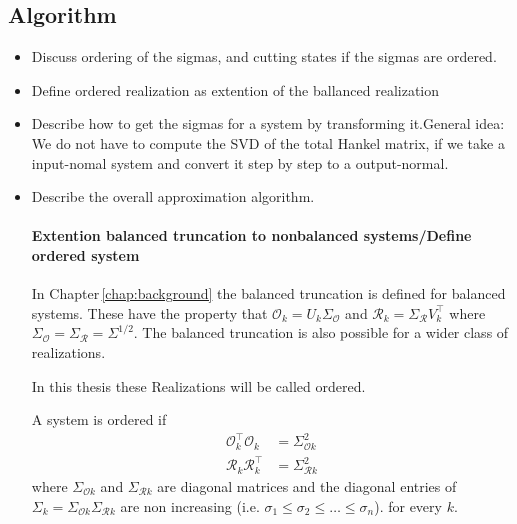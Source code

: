 \documentclass[doctype=mastersthesis,BCOR=15mm,biblatex]{ldvbook}%
\DeclareMathOperator{\diag}{diag}
\newcommand{\R}{\mathcal{R}} %
\newcommand{\Ob}{\mathcal{O}} %
\begin{document}
\subsection{Algorithm}
\begin{itemize}


\item Discuss ordering of the sigmas, and cutting states if the sigmas are ordered.
\item Define ordered realization as extention of the ballanced realization

\item Describe how to get the sigmas for a system by transforming it.General idea: We do not have to compute the SVD of the total Hankel matrix, if we take a input-nomal system and convert it step by step to a output-normal.

\item Describe the overall approximation algorithm.

\paragraph{Extention balanced truncation to nonbalanced systems/Define ordered system}
In Chapter\,\ref{chap:background} the balanced truncation is defined for balanced systems.
These have the property that $\Ob_k = U_k \Sigma_\Ob$ and $\R_k = \Sigma_\R V_k^\top$ where $\Sigma_\Ob = \Sigma_\R=\Sigma^{1/2}$.
The balanced truncation is also possible for a wider class of realizations.

In this thesis these Realizations will be called ordered.
\begin{definition}
	A system is ordered if 
	\begin{subequations}
	\begin{align}
		\Ob_k^\top \Ob_k &= \Sigma_ {\Ob k}^2 \label{eq:orderd_obs}\\ %
		\R_k \R_k^\top &= \Sigma_ {\R k}^2 \label{eq:orderd_reach}%
	\end{align}
	\end{subequations}
	where $\Sigma_{\Ob k}$ and $\Sigma_{\R k}$ are diagonal matrices
	and the diagonal entries of $\Sigma_k =\Sigma_{\Ob k}\Sigma_{\R k}$ are non increasing (i.e. $\sigma_1 \leq \sigma_2 \leq \dots \leq \sigma_n$).
    for every $k$.
\end{definition}


\end{itemize}
\end{document}
